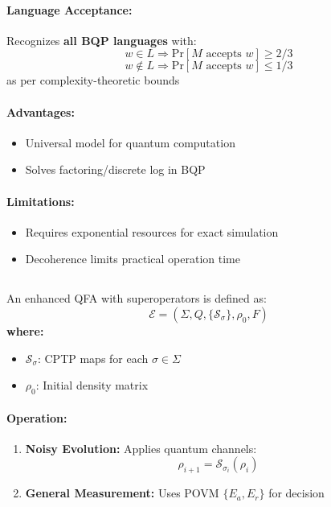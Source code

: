 \paragraph{Language Acceptance:}
Recognizes \textbf{all BQP languages} \cite{shor1994algorithms} with:
\[
w \in L \Rightarrow \text{Pr}[M \text{ accepts } w] \geq 2/3
\]
\[
w \notin L \Rightarrow \text{Pr}[M \text{ accepts } w] \leq 1/3
\]
as per complexity-theoretic bounds \cite{nielsen2010quantum}

\paragraph{Advantages:}
\begin{itemize}
    \item Universal model for quantum computation
    \item Solves factoring/discrete log in BQP
\end{itemize}

\paragraph{Limitations:}
\begin{itemize}
    \item Requires exponential resources for exact simulation
    \item Decoherence limits practical operation time
\end{itemize}

\subsection{}
\label{subsec:eqfa}

\begin{definition}
An enhanced QFA with superoperators is defined as:
\[
\mathcal{E} = (\Sigma, Q, \{\mathcal{S}_\sigma\}, \rho_0, F)
\]
\textbf{where:}
\begin{itemize}
    \item $\mathcal{S}_\sigma$: CPTP maps for each $\sigma \in \Sigma$
    \item $\rho_0$: Initial density matrix
\end{itemize}
\end{definition}

\paragraph{Operation:}
\begin{enumerate}
    \item \textbf{Noisy Evolution:} Applies quantum channels:
    \[
    \rho_{i+1} = \mathcal{S}_{\sigma_i}(\rho_i)
    \]
    \item \textbf{General Measurement:} Uses POVM $\{E_a, E_r\}$ for decision
\end{enumerate}

